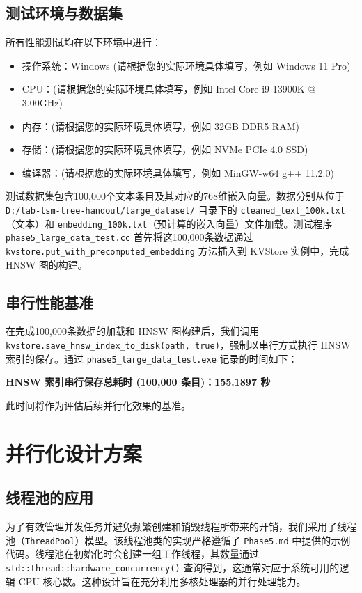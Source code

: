 \documentclass{ctexart} %
\begin{document}
\subsection{测试环境与数据集}
所有性能测试均在以下环境中进行：
\begin{itemize}
    \item 操作系统：Windows (请根据您的实际环境具体填写，例如 Windows 11 Pro)
    \item CPU：(请根据您的实际环境具体填写，例如 Intel Core i9-13900K @ 3.00GHz)
    \item 内存：(请根据您的实际环境具体填写，例如 32GB DDR5 RAM)
    \item 存储：(请根据您的实际环境具体填写，例如 NVMe PCIe 4.0 SSD)
    \item 编译器：(请根据您的实际环境具体填写，例如 MinGW-w64 g++ 11.2.0)
\end{itemize}
测试数据集包含100,000个文本条目及其对应的768维嵌入向量。数据分别从位于 \texttt{D:/lab-lsm-tree-handout/large_dataset/} 目录下的 \texttt{cleaned_text_100k.txt}（文本）和 \texttt{embedding_100k.txt}（预计算的嵌入向量）文件加载。测试程序 \texttt{phase5_large_data_test.cc} 首先将这100,000条数据通过 \texttt{kvstore.put_with_precomputed_embedding} 方法插入到 KVStore 实例中，完成 HNSW 图的构建。

\subsection{串行性能基准}
在完成100,000条数据的加载和 HNSW 图构建后，我们调用 \texttt{kvstore.save_hnsw_index_to_disk(path, true)}，强制以串行方式执行 HNSW 索引的保存。通过 \texttt{phase5_large_data_test.exe} 记录的时间如下：

\textbf{HNSW 索引串行保存总耗时 (100,000 条目)：155.1897 秒}

此时间将作为评估后续并行化效果的基准。

\section{并行化设计方案}

\subsection{线程池的应用}
为了有效管理并发任务并避免频繁创建和销毁线程所带来的开销，我们采用了线程池（\texttt{ThreadPool}）模型。该线程池类的实现严格遵循了 \texttt{Phase5.md} 中提供的示例代码。线程池在初始化时会创建一组工作线程，其数量通过 \texttt{std::thread::hardware_concurrency()} 查询得到，这通常对应于系统可用的逻辑 CPU 核心数。这种设计旨在充分利用多核处理器的并行处理能力。
\end{document}

